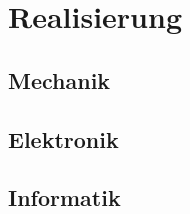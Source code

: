 \begin{frame}
    \titlepage
\end{frame}

\setcounter{tocdepth}{1} %
\begin{frame}
    \tableofcontents
\end{frame}


\section{Realisierung}

\subsection{Mechanik}


\subsection{Elektronik}

\subsection{Informatik}





